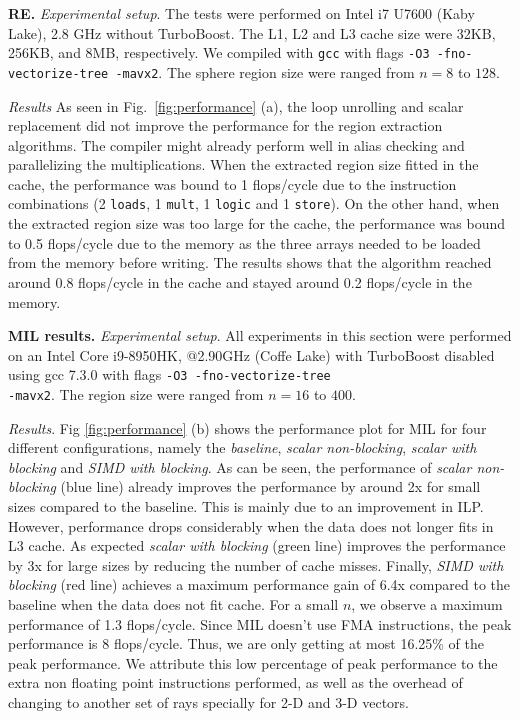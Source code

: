 \documentclass[letterpaper]{article}
\newcommand{\mypar}[1]{{\bf #1.}}
\begin{document}
\mypar{RE} \textit{Experimental setup}. The tests were performed on Intel i7 U7600 (Kaby Lake), 2.8 GHz without TurboBoost. The L1, L2 and L3 cache size were 32KB, 256KB, and 8MB, respectively. We compiled with \texttt{gcc} with flags \texttt{-O3 -fno-vectorize-tree -mavx2}. The sphere region size were ranged from $n=8$ to $128$.

\textit{Results} As seen in Fig.~\ref{fig:performance} (a), the loop unrolling and scalar replacement did not improve the performance for the region extraction algorithms. The compiler might already perform well in alias checking and parallelizing the multiplications. When the extracted region size fitted in the cache, the performance was bound to 1 flops/cycle due to the instruction combinations (2 {\tt loads}, 1 {\tt mult}, 1 {\tt logic} and 1 {\tt store}). On the other hand, when the extracted region size was too large for the cache, the performance was bound to 0.5 flops/cycle due to the memory as the three arrays needed to be loaded from the memory before writing. The results shows that the algorithm reached around 0.8 flops/cycle in the cache and stayed around 0.2 flops/cycle in the memory.   

\mypar{MIL results} 
\textit{Experimental setup}.
All experiments in this section were performed on an Intel Core i9-8950HK, @2.90GHz (Coffe Lake) with TurboBoost disabled using gcc 7.3.0 with flags \texttt{-O3 -fno-vectorize-tree \\-mavx2}. The region size were ranged from $n=16$ to $400$.

\textit{Results}. Fig \ref{fig:performance} (b) shows the performance plot for MIL for four different configurations, namely the \textit{baseline},\textit{ scalar non-blocking}, \textit{scalar with blocking} and \textit{SIMD with blocking}. As can be seen, the performance of \textit{scalar non-blocking} (blue line) already improves the performance by around 2x for small sizes compared to the baseline. This is mainly due to an improvement in ILP. However, performance drops considerably when the data does not longer fits in L3 cache. As expected \textit{scalar with blocking} (green line) improves the performance by 3x for large sizes by reducing the number of cache misses. Finally, \textit{SIMD with blocking} (red line) achieves a maximum performance gain of 6.4x compared to the baseline when the data does not fit cache. For a small $n$, we observe a maximum performance of 1.3 flops/cycle. Since MIL doesn't use FMA instructions, the peak performance is 8 flops/cycle. Thus, we are only getting at most 16.25\% of the peak performance. We attribute this low percentage of peak performance to the extra non floating point instructions performed, as well as the overhead of changing to another set of rays specially for 2-D and 3-D vectors.
\end{document}
